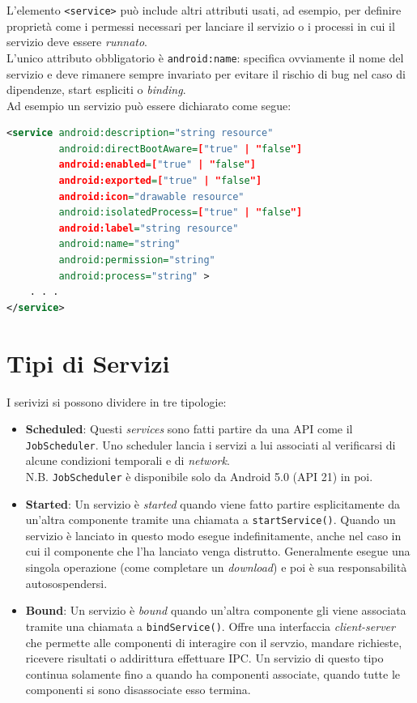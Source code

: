 L'elemento \texttt{<service>} può include altri attributi usati, ad esempio, per definire proprietà come i permessi necessari per lanciare il servizio o i processi in cui il servizio deve essere \textit{runnato}.\\
L'unico attributo obbligatorio è \texttt{android:name}: specifica ovviamente il nome del servizio e deve rimanere sempre invariato per evitare il rischio di bug nel caso di dipendenze, start espliciti o \textit{binding}.\\
Ad esempio un servizio può essere dichiarato come segue:
\begin{lstlisting}[language=XML]
<service android:description="string resource"
         android:directBootAware=["true" | "false"]
         android:enabled=["true" | "false"]
         android:exported=["true" | "false"]
         android:icon="drawable resource"
         android:isolatedProcess=["true" | "false"]
         android:label="string resource"
         android:name="string"
         android:permission="string"
         android:process="string" >
    . . .
</service>
\end{lstlisting}



\section{Tipi di Servizi}
I serivizi si possono dividere in tre tipologie:
\begin{itemize}
	\item \textbf{Scheduled}: Questi \textit{services} sono fatti partire da una API come il \texttt{JobScheduler}. Uno scheduler lancia i servizi a lui associati al verificarsi di alcune condizioni temporali e di \textit{network}.\\
	N.B. \texttt{JobScheduler} è disponibile solo da Android 5.0 (API 21) in poi.
	\item \textbf{Started}: Un servizio è \textit{started} quando viene fatto partire esplicitamente da un'altra componente tramite una chiamata a \texttt{startService()}. Quando un servizio è lanciato in questo modo esegue indefinitamente, anche nel caso in cui il componente che l'ha lanciato venga distrutto. Generalmente esegue una singola operazione (come completare un \textit{download}) e poi è sua responsabilità autosospendersi. 
	\item \textbf{Bound}: Un servizio è \textit{bound} quando un'altra componente gli viene associata tramite una chiamata a \texttt{bindService()}. Offre una interfaccia \textit{client-server} che permette alle componenti di interagire con il servzio, mandare richieste, ricevere risultati o addirittura effettuare IPC. Un servizio di questo tipo continua solamente fino a quando ha componenti associate, quando tutte le componenti si sono disassociate esso termina.
\end{itemize}


